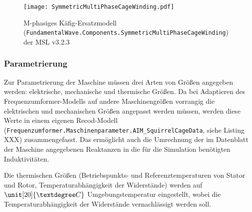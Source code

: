 \begin{figure}
\centering
\texttt{[image: SymmetricMultiPhaseCageWinding.pdf]}
\caption{M-phasiges Käfig-Ersatzmodell
(\texttt{FundamentalWave.Components.SymmetricMultiPhaseCageWinding}) der
MSL v3.2.3}
\end{figure}

\hypertarget{parametrierung}{%
\subsubsection{Parametrierung}\label{parametrierung}}

Zur Parametrierung der Maschine müssen drei Arten von Größen angegeben
werden: elektrische, mechanische und thermische Größen. Da bei
Adaptieren des Frequenzumformer-Modells auf andere Maschinengrößen
vorrangig die elektrischen und mechanischen Größen angepasst werden
müssen, werden diese Werte in einem eigenen Recod-Modell
(\texttt{Frequenzumformer.Maschinenparameter.AIM\_SquirrelCageData},
siehe Listing XXX) zusammengefasst. Das ermöglicht auch die Umrechnung
der im Datenblatt der Maschine angegebenen Reaktanzen in die für die
Simulation benötigten Induktivitäten.

Die thermischen Größen (Betriebspunkts- und Referenztemperaturen von
Stator und Rotor, Temperaturabhängigkeit der Widerstände) werden auf
\(\unit[20]{°C}\) Umgebungstemperatur eingestellt, wobei die
Temperaturabhängigkeit der Widerstände vernachlässigt werden soll.

